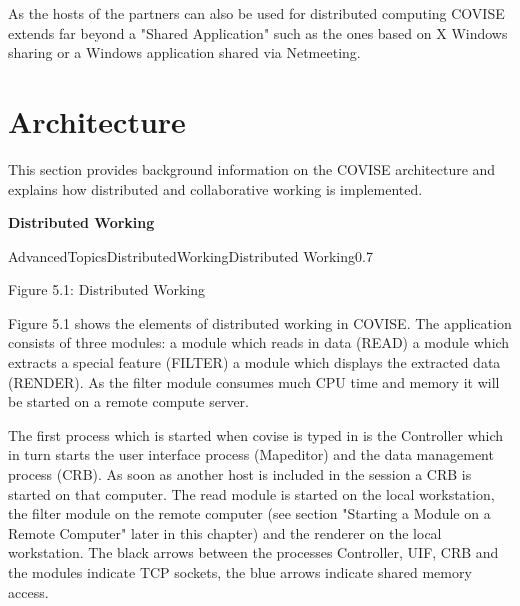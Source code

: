 As the hosts of the partners can also be used for distributed computing COVISE extends 
far beyond a "Shared Application" such as the ones based on X Windows sharing or a 
Windows application shared via Netmeeting.



\section{Architecture}

This section provides background information on the COVISE architecture and explains how distributed and
collaborative working is implemented.

\vspace{0.5cm}
\begin{Large}{\bf Distributed Working}\end{Large}
\vspace{0.5cm}

\begin{covimg}{AdvancedTopics}{DistributedWorking}{Distributed Working}{0.7}\end{covimg}
\begin{htmlonly}
Figure 5.1: Distributed Working
\vspace{0.5cm}
\end{htmlonly}


Figure 5.1 shows the elements of distributed working in COVISE. The application consists 
of three modules: a module which reads in data (READ) a module which extracts a special 
feature (FILTER) a module which displays the extracted data (RENDER). As the filter 
module consumes much CPU time and memory it will be started on a remote compute server. 

The first process which is started when covise is typed in is the Controller which in 
turn starts the user interface process (Mapeditor) and the data management process (CRB). 
As soon as another host is included in the session a CRB is started on that computer. 
The read module is started on the local workstation, the filter module on the remote 
computer (see section "Starting a Module on a Remote Computer" later in this chapter) 
and the renderer on the local workstation. The black arrows between the processes 
Controller, UIF, CRB and the modules indicate TCP sockets, the blue arrows indicate 
shared memory access. 

